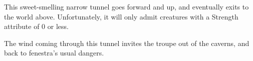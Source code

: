 \begin{multicols}{2}




This sweet-smelling narrow tunnel goes forward and up, and eventually exits to the world above.
Unfortunately, it will only admit creatures with a Strength \gls{attribute} of 0 or less.



The wind coming through this tunnel invites the troupe out of the caverns, and back to \gls{fenestra}'s usual dangers.

\end{multicols}

